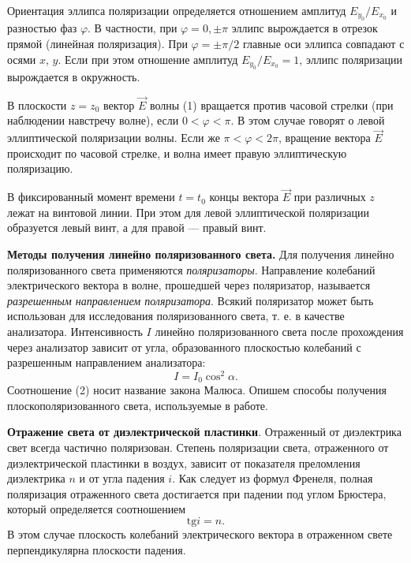 \documentclass[a4paper, 12pt]{article}
\begin{document}
	Ориентация эллипса поляризации определяется отношением амплитуд $E_{y_0}/E_{x_0}$ и разностью фаз $\varphi$. В частности, при $\varphi = 0, \pm\pi$ эллипс вырождается в отрезок прямой (линейная поляризация). При $\varphi = \pm\pi/2$ главные оси эллипса совпадают с осями $x$, $y$. Если при этом отношение амплитуд $E_{y_0}/E_{x_0} = 1$, эллипс поляризации вырождается в окружность.	
	
	В плоскости $z = z_0$ вектор $\vec{E}$ волны (1) вращается против часовой стрелки (при наблюдении навстречу волне), если $0 < \varphi < \pi$. В этом случае говорят о левой эллиптической поляризации волны. Если же
	$\pi < \varphi < 2\pi$, вращение вектора $\vec{E}$ происходит по часовой стрелке, и волна имеет правую эллиптическую поляризацию.
	
	
	В фиксированный момент времени $t = t_0$ концы вектора $\vec{E}$ при различных $z$ лежат на винтовой линии. При этом для левой эллиптической поляризации образуется левый винт, а для правой --- правый винт.
	
	\textbf{Методы получения линейно поляризованного света.} Для получения линейно поляризованного света применяются \textit{поляризаторы}. Направление колебаний электрического вектора в волне, прошедшей через поляризатор, называется \textit{разрешенным направлением поляризатора}. Всякий поляризатор может быть использован для исследования поляризованного света, т. е. в качестве анализатора. Интенсивность $I$ линейно поляризованного света после прохождения через анализатор зависит от угла, образованного плоскостью колебаний с разрешенным направлением анализатора:
	\begin{equation}
	I = I_0 \cos^2\alpha.
	\end{equation}
	Соотношение (2) носит название закона Малюса. Опишем способы получения плоскополяризованного света, используемые в работе.
	
	\textbf{Отражение света от диэлектрической пластинки}. Отраженный от диэлектрика свет всегда частично поляризован. Степень поляризации света, отраженного от диэлектрической пластинки в воздух, зависит от показателя преломления диэлектрика $n$ и от угла падения $i$. Как следует из формул Френеля, полная поляризация отраженного света достигается при падении под углом Брюстера, который определяется соотношением
	\begin{equation}
	\text{tg}i = n.
	\end{equation}
	В этом случае плоскость колебаний электрического вектора в отраженном свете перпендикулярна плоскости падения.
	
\end{document}
